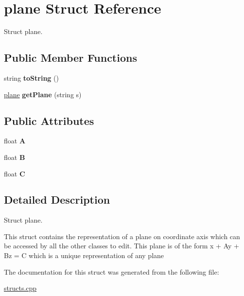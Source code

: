 \hypertarget{structplane}{}\section{plane Struct Reference}
\label{structplane}


Struct plane.  


\subsection*{Public Member Functions}
\begin{DoxyCompactItemize}
\item 
string {\bfseries to\+String} ()\hypertarget{structplane_a1a13999da709be0884b258871749094b}{}\label{structplane_a1a13999da709be0884b258871749094b}

\item 
\hyperlink{structplane}{plane} {\bfseries get\+Plane} (string s)\hypertarget{structplane_a88a050d1c95ab55513c8c9f55a666d14}{}\label{structplane_a88a050d1c95ab55513c8c9f55a666d14}

\end{DoxyCompactItemize}
\subsection*{Public Attributes}
\begin{DoxyCompactItemize}
\item 
float {\bfseries A}\hypertarget{structplane_a7cbe59df743ed3cf5b914b94e5d8ae52}{}\label{structplane_a7cbe59df743ed3cf5b914b94e5d8ae52}

\item 
float {\bfseries B}\hypertarget{structplane_a03abeea8dacf60d86309aa336269906f}{}\label{structplane_a03abeea8dacf60d86309aa336269906f}

\item 
float {\bfseries C}\hypertarget{structplane_a88b564304a3acb0f68186e2ea71a0cdc}{}\label{structplane_a88b564304a3acb0f68186e2ea71a0cdc}

\end{DoxyCompactItemize}


\subsection{Detailed Description}
Struct plane. 

This struct contains the representation of a plane on coordinate axis which can be accessed by all the other classes to edit. This plane is of the form x + Ay + Bz = C which is a unique representation of any plane 

The documentation for this struct was generated from the following file\+:\begin{DoxyCompactItemize}
\item 
\hyperlink{structs_8cpp}{structs.\+cpp}\end{DoxyCompactItemize}
